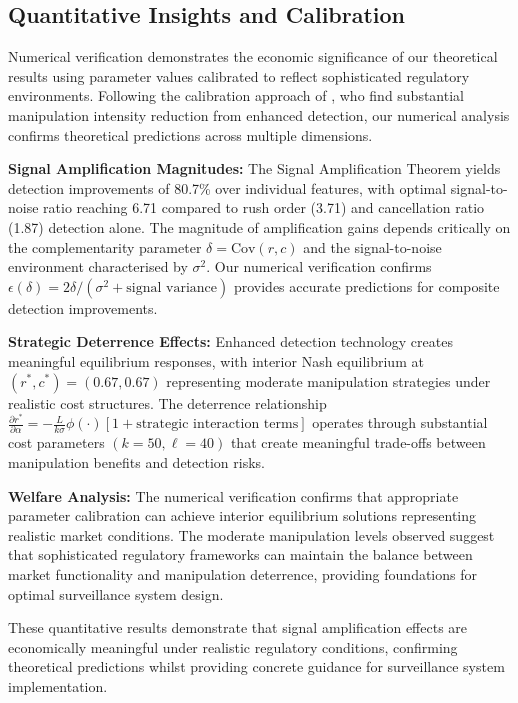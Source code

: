 \documentclass[12pt]{article}
\begin{document}
\subsection{Quantitative Insights and Calibration}

Numerical verification demonstrates the economic significance of our theoretical results using parameter values calibrated to reflect sophisticated regulatory environments. Following the calibration approach of \citet{liu2024asset}, who find substantial manipulation intensity reduction from enhanced detection, our numerical analysis confirms theoretical predictions across multiple dimensions.

\textbf{Signal Amplification Magnitudes:} The Signal Amplification Theorem yields detection improvements of 80.7\% over individual features, with optimal signal-to-noise ratio reaching 6.71 compared to rush order (3.71) and cancellation ratio (1.87) detection alone. The magnitude of amplification gains depends critically on the complementarity parameter $\delta = \text{Cov}(r,c)$ and the signal-to-noise environment characterised by $\sigma^2$. Our numerical verification confirms $\epsilon(\delta) = 2\delta/(\sigma^2 + \text{signal variance})$ provides accurate predictions for composite detection improvements.

\textbf{Strategic Deterrence Effects:} Enhanced detection technology creates meaningful equilibrium responses, with interior Nash equilibrium at $(r^*, c^*) = (0.67, 0.67)$ representing moderate manipulation strategies under realistic cost structures. The deterrence relationship $\frac{\partial r^*}{\partial \alpha} = -\frac{L}{k\sigma} \phi(\cdot)[1 + \text{strategic interaction terms}]$ operates through substantial cost parameters $(k=50, \ell=40)$ that create meaningful trade-offs between manipulation benefits and detection risks.

\textbf{Welfare Analysis:} The numerical verification confirms that appropriate parameter calibration can achieve interior equilibrium solutions representing realistic market conditions. The moderate manipulation levels observed suggest that sophisticated regulatory frameworks can maintain the balance between market functionality and manipulation deterrence, providing foundations for optimal surveillance system design.

These quantitative results demonstrate that signal amplification effects are economically meaningful under realistic regulatory conditions, confirming theoretical predictions whilst providing concrete guidance for surveillance system implementation.
\end{document}
